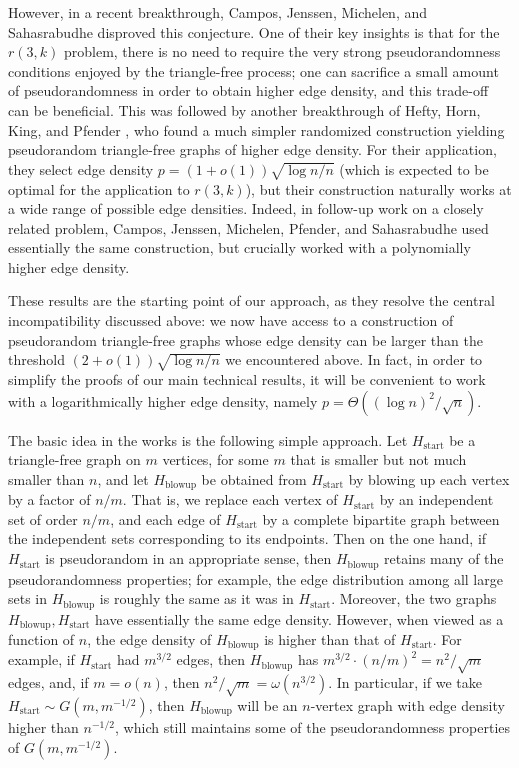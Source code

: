 \documentclass[11pt,reqno,oneside]{amsart}
\theoremstyle{definition}
\newcommand\1{\mathbf{1}}
\begin{document}
However, in a recent breakthrough, Campos, Jenssen, Michelen, and Sahasrabudhe \cite{2505.13371} disproved this conjecture. One of their key insights is that for the $r(3,k)$ problem, there is no need to require the very strong pseudorandomness conditions enjoyed by the triangle-free process; one can sacrifice a small amount of pseudorandomness in order to obtain higher edge density, and this trade-off can be beneficial. This was followed by another breakthrough of Hefty, Horn, King, and Pfender \cite{2510.19718}, who found a much simpler randomized construction yielding pseudorandom triangle-free graphs of higher edge density. For their application, they select edge density $p=(1+o(1))\sqrt{\log n/n}$ (which is expected to be optimal for the application to $r(3,k)$), but their construction naturally works at a wide range of possible edge densities.
Indeed, in follow-up work on a closely related problem, Campos, Jenssen, Michelen, Pfender, and Sahasrabudhe \cite{2511.10641} used essentially the same construction, but crucially worked with a polynomially higher edge density.

These results are the starting point of our approach, as they resolve the central incompatibility discussed above: we now have access to a construction of pseudorandom triangle-free graphs whose edge density can be larger than the threshold $(2+o(1))\sqrt{\log n/n}$ we encountered above. In fact, in order to simplify the proofs of our main technical results, it will be convenient to work with a logarithmically higher edge density, namely $p = \Theta((\log n)^2/\sqrt n)$.

The basic idea in the works \cite{2505.13371,2511.10641,2510.19718} is the following simple approach. Let $H_{\mathrm{start}}$ be a triangle-free graph on $m$ vertices, for some $m$ that is smaller but not much smaller than $n$, and let $H_{\mathrm{blowup}}$ be obtained from $H_{\mathrm{start}}$ by blowing up each vertex by a factor of $n/m$. That is, we replace each vertex of $H_{\mathrm{start}}$ by an independent set of order $n/m$, and each edge of $H_{\mathrm{start}}$ by a complete bipartite graph between the independent sets corresponding to its endpoints. Then on the one hand, if $H_{\mathrm{start}}$ is pseudorandom in an appropriate sense, then $H_{\mathrm{blowup}}$ retains many of the pseudorandomness properties; for example, the edge distribution among all large sets in $H_{\mathrm{blowup}}$ is roughly the same as it was in $H_{\mathrm{start}}$. Moreover, the two graphs $H_{\mathrm{blowup}},H_{\mathrm{start}}$ have essentially the same edge density. However, when viewed as a function of $n$, the edge density of $H_{\mathrm{blowup}}$ is higher than that of $H_{\mathrm{start}}$. For example, if $H_{\mathrm{start}}$ had $m^{3/2}$ edges, then $H_{\mathrm{blowup}}$ has $m^{3/2}\cdot(n/m)^2 = n^2/\sqrt m$ edges, and, if $m=o(n)$, then $n^2/\sqrt m = \omega(n^{3/2})$. In particular, if we take $H_{\mathrm{start}} \sim G(m,m^{-1/2})$, then $H_{\mathrm{blowup}}$ will be an $n$-vertex graph with edge density higher than $n^{-1/2}$, which still maintains some of the pseudorandomness properties of $G(m,m^{-1/2})$.
\end{document}
